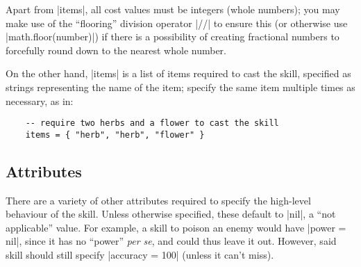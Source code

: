 Apart from |items|, all cost values must be integers (whole numbers);
you may make use of the ``flooring'' division operator |//| to ensure this
(or otherwise use |math.floor(number)|)
if there is a possibility of creating fractional numbers
to forcefully round down to the nearest whole number.

On the other hand, |items| is a list of items required to cast the skill,
specified as strings representing the name of the item;
specify the same item multiple times as necessary, as in:
\begin{lstlisting}
    -- require two herbs and a flower to cast the skill
    items = { "herb", "herb", "flower" }
\end{lstlisting}

\subsection{Attributes}
\label{sec:skill_attrs}

There are a variety of other attributes required to specify
the high-level behaviour of the skill.
Unless otherwise specified, these default to |nil|, a ``not applicable'' value.
For example, a skill to poison an enemy would have |power = nil|,
since it has no ``power'' \emph{per se},
and could thus leave it out.
However, said skill should still specify |accuracy = 100| (unless it can't miss).

